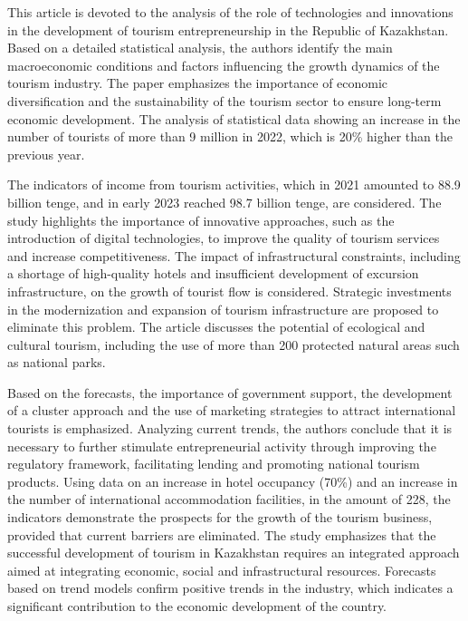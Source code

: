 This article is devoted to the analysis of the role of technologies and
innovations in the development of tourism entrepreneurship in the
Republic of Kazakhstan. Based on a detailed statistical analysis, the
authors identify the main macroeconomic conditions and factors
influencing the growth dynamics of the tourism industry. The paper
emphasizes the importance of economic diversification and the
sustainability of the tourism sector to ensure long-term economic
development. The analysis of statistical data showing an increase in the
number of tourists of more than 9 million in 2022, which is 20\% higher
than the previous year.

The indicators of income from tourism activities, which in 2021 amounted
to 88.9 billion tenge, and in early 2023 reached 98.7 billion tenge, are
considered. The study highlights the importance of innovative
approaches, such as the introduction of digital technologies, to improve
the quality of tourism services and increase competitiveness. The impact
of infrastructural constraints, including a shortage of high-quality
hotels and insufficient development of excursion infrastructure, on the
growth of tourist flow is considered. Strategic investments in the
modernization and expansion of tourism infrastructure are proposed to
eliminate this problem. The article discusses the potential of
ecological and cultural tourism, including the use of more than 200
protected natural areas such as national parks.

Based on the forecasts, the importance of government support, the
development of a cluster approach and the use of marketing strategies to
attract international tourists is emphasized. Analyzing current trends,
the authors conclude that it is necessary to further stimulate
entrepreneurial activity through improving the regulatory framework,
facilitating lending and promoting national tourism products. Using data
on an increase in hotel occupancy (70\%) and an increase in the number
of international accommodation facilities, in the amount of 228, the
indicators demonstrate the prospects for the growth of the tourism
business, provided that current barriers are eliminated. The study
emphasizes that the successful development of tourism in Kazakhstan
requires an integrated approach aimed at integrating economic, social
and infrastructural resources. Forecasts based on trend models confirm
positive trends in the industry, which indicates a significant
contribution to the economic development of the country.

